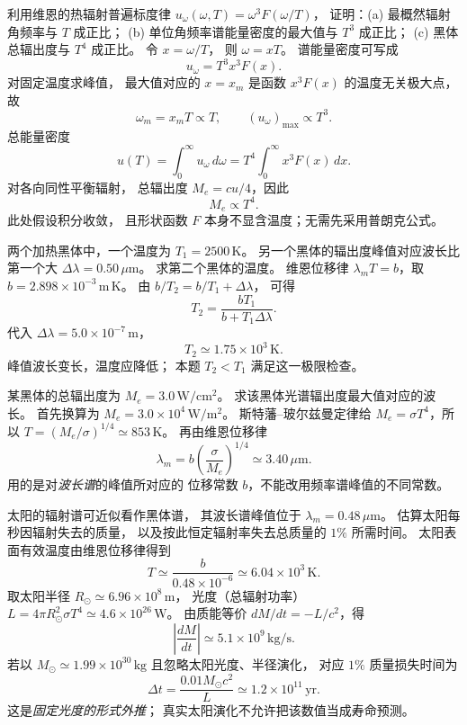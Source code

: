 
利用维恩的热辐射普遍标度律
$u_\omega(\omega,T)=\omega^3F(\omega/T)$，
证明：(a) 最概然辐射角频率与 $T$ 成正比；
(b) 单位角频率谱能量密度的最大值与 $T^3$ 成正比；
(c) 黑体总辐出度与 $T^4$ 成正比。
\exsolution
令 $x=\omega/T$，
则 $\omega=xT$。
谱能量密度可写成
\[
 u_\omega=T^3x^3F(x).
\]
对固定温度求峰值，
最大值对应的 $x=x_m$ 是函数 $x^3F(x)$
的温度无关极大点，故
\[
 \boxed{\omega_m=x_mT\propto T},\qquad
 \boxed{(u_\omega)_{\max}\propto T^3}.
\]
总能量密度
\[
 u(T)=\int_0^\infty u_\omega\,d\omega
 =T^4\int_0^\infty x^3F(x)\,dx.
\]
对各向同性平衡辐射，
总辐出度 $M_e=cu/4$，因此
\[
 \boxed{M_e\propto T^4}.
\]
\excheck 此处假设积分收敛，
且形状函数 $F$ 本身不显含温度；无需先采用普朗克公式。

两个加热黑体中，一个温度为
$T_1=2500\,\mathrm K$。
另一个黑体的辐出度峰值对应波长比第一个大
$\Delta\lambda=0.50\,\mu\mathrm m$。
求第二个黑体的温度。
\exsolution
维恩位移律
$\lambda_m T=b$，取
$b=2.898\times10^{-3}\,\mathrm{m\,K}$。
由
$b/T_2=b/T_1+\Delta\lambda$，
可得
\[
 \boxed{T_2=
 \frac{bT_1}{b+T_1\Delta\lambda}}.
\]
代入
$\Delta\lambda=5.0\times10^{-7}\,\mathrm m$，
\[
 \boxed{T_2\simeq1.75\times10^3\,\mathrm K}.
\]
\excheck 峰值波长变长，温度应降低；
本题 $T_2<T_1$ 满足这一极限检查。

某黑体的总辐出度为
$M_e=3.0\,\mathrm{W/cm^2}$。
求该黑体光谱辐出度最大值对应的波长。
\exsolution
首先换算为
$M_e=3.0\times10^4\,\mathrm{W/m^2}$。
斯特藩--玻尔兹曼定律给
$M_e=\sigma T^4$，所以
$T=(M_e/\sigma)^{1/4}\simeq853\,\mathrm K$。
再由维恩位移律
\[
 \boxed{\lambda_m=
 b\left(\frac{\sigma}{M_e}\right)^{1/4}
 \simeq3.40\,\mu\mathrm m}.
\]
\excheck 用的是对\emph{波长谱}的峰值所对应的
位移常数 $b$，不能改用频率谱峰值的不同常数。

太阳的辐射谱可近似看作黑体谱，
其波长谱峰值位于
$\lambda_m=0.48\,\mu\mathrm m$。
估算太阳每秒因辐射失去的质量，
以及按此恒定辐射率失去总质量的 $1\%$
所需时间。
\exsolution
太阳表面有效温度由维恩位移律得到
\[
 T\simeq\frac{b}{0.48\times10^{-6}}
 \simeq6.04\times10^3\,\mathrm K.
\]
取太阳半径
$R_\odot\simeq6.96\times10^8\,\mathrm m$，
光度（总辐射功率）
$L=4\pi R_\odot^2\sigma T^4
\simeq4.6\times10^{26}\,\mathrm W$。
由质能等价
$dM/dt=-L/c^2$，得
\[
 \boxed{\left|\frac{dM}{dt}\right|
 \simeq5.1\times10^9\,\mathrm{kg/s}}.
\]
若以
$M_\odot\simeq1.99\times10^{30}\,\mathrm{kg}$
且忽略太阳光度、半径演化，
对应 $1\%$ 质量损失时间为
\[
 \boxed{\Delta t=
 \frac{0.01M_\odot c^2}{L}
 \simeq1.2\times10^{11}\,\mathrm{yr}}.
\]
\excheck 这是\emph{固定光度的形式外推}；
真实太阳演化不允许把该数值当成寿命预测。


